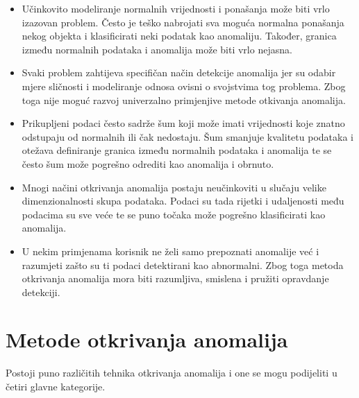 \documentclass[utf8, diplomski, numeric]{fer}
\begin{document}
\begin{itemize}
\item Učinkovito modeliranje normalnih vrijednosti i ponašanja može biti vrlo izazovan problem. Često je teško nabrojati sva moguća normalna ponašanja nekog objekta i klasificirati neki podatak kao anomaliju. Također, granica  između normalnih podataka i anomalija može biti vrlo nejasna.
\item Svaki problem zahtijeva specifičan način detekcije anomalija jer su odabir mjere sličnosti i modeliranje odnosa ovisni o svojstvima tog problema. Zbog toga nije moguć razvoj univerzalno primjenjive metode otkivanja anomalija.
\item Prikupljeni podaci često sadrže šum koji može imati vrijednosti koje znatno odstupaju od normalnih ili čak nedostaju. Šum smanjuje kvalitetu podataka i otežava definiranje granica između normalnih podataka i anomalija te se često šum može pogrešno odrediti kao anomalija i obrnuto.
\item Mnogi načini otkrivanja anomalija postaju neučinkoviti u slučaju velike dimenzionalnosti skupa podataka. Podaci su tada rijetki i udaljenosti među podacima su sve veće te se puno točaka može pogrešno klasificirati kao anomalija.
\item U nekim primjenama korisnik ne želi samo prepoznati anomalije već i razumjeti zašto su ti podaci detektirani kao abnormalni. Zbog toga metoda otkrivanja anomalija mora biti razumljiva, smislena i pružiti opravdanje detekciji.
\end{itemize}

\section{Metode otkrivanja anomalija}
Postoji puno različitih tehnika otkrivanja anomalija i one se mogu podijeliti u četiri glavne kategorije.
\end{document}
